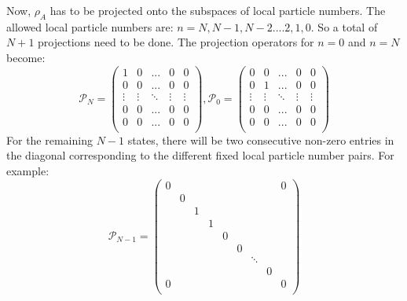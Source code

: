 Now, $\rho_{A}$ has to be projected onto the subspaces of local particle numbers. The allowed local particle numbers are: $n = N, N-1, N-2 .... 2, 1, 0$. So a total of $N+1$ projections need to be done. The projection operators for $n=0$ and $n=N$ become:
%
\begin{equation}
\mathcal{P}_{N} = \begin{pmatrix} 
1 & 0 &... & 0 & 0 \\
0 & 0 & ... & 0 & 0 \\
\vdots & \vdots & \ddots & \vdots & \vdots \\
0 & 0 & ... & 0 & 0 \\
0 & 0 & ... & 0 & 0 \\
\end{pmatrix} , 
\mathcal{P}_{0} = \begin{pmatrix} 
0 & 0 &... & 0 & 0 \\
0 & 1 & ... & 0 & 0 \\
\vdots & \vdots & \ddots & \vdots & \vdots \\
0 & 0 & ... & 0 & 0 \\
0 & 0 & ... & 0 & 0 \\
\end{pmatrix}
\end{equation}
%
For the remaining $N - 1$ states, there will be two consecutive non-zero entries in the diagonal corresponding to the different fixed local particle number pairs. For example:
%
\begin{equation}
\mathcal{P}_{N-1} = \begin{pmatrix} 
0 & & & & & & & & 0 \\
& 0 \\
& & 1 \\
& & & 1 \\
& & & &  0 \\
& & & & & 0 \\
& & & & &  & \ddots \\
& & & & & & &  0 \\
0 & & & & & & & & 0 \\
\end{pmatrix}
\nonumber
\end{equation}
%
